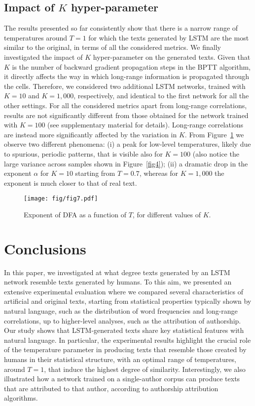 \documentclass[journal]{IEEEtran}
\begin{document}
\subsection{Impact of $K$ hyper-parameter}
The results presented so far consistently show that there is a narrow range of temperatures around $T=1$ for which
the texts generated by LSTM are the most similar to the original, in terms of all the considered metrics.
%
We finally investigated the impact of $K$ hyper-parameter on the generated texts. Given that $K$ is the number of backward gradient propagation steps in the BPTT algorithm, it directly affects the way in which long-range information is propagated through the cells. Therefore, we considered two additional LSTM networks, trained with $K=10$ and $K=1,000$, respectively, and identical to the first network for all the other settings.
%
For all the considered metrics apart from long-range correlations, results are not significantly different from those obtained for the network trained with $K=100$ (see supplementary material for details). Long-range correlations are instead more significantly affected by the variation in $K$. From Figure~\ref{fig:comparison} we observe two different phenomena: (i) a peak for low-level temperatures, likely due to spurious, periodic patterns, that is visible also for $K=100$ (also notice the large variance across samples shown in Figure~\ref{fig4}); (ii) a dramatic drop in the exponent $\alpha$ for $K=10$ starting from $T=0.7$, whereas for $K=1,000$ the exponent is much closer to that of real text.

\begin{figure}[!t]
\begin{center}
\texttt{[image: fig/fig7.pdf]}
 \caption{Exponent of DFA as a function of $T$, for different values of $K$.
\label{fig:comparison}}
\end{center}
\end{figure}



\section{Conclusions}
\label{sec:conclusions}

In this paper, we investigated at what degree texts generated by an LSTM network resemble texts generated by humans. To this aim, we presented an extensive experimental evaluation where we compared several characteristics of artificial and original texts, starting from statistical properties typically shown by natural language, such as the distribution of word frequencies and long-range correlations, up to higher-level analyses, such as the attribution of authorship.
%
Our study shows that LSTM-generated texts share key statistical features with natural language. In particular, the experimental results highlight the crucial role of the temperature parameter in producing texts that resemble those created by humans in their statistical structure, with an optimal range of temperatures, around $T=1$, that induce the highest degree of similarity. Interestingly, we also illustrated how a network trained on a single-author corpus can produce texts that are attributed to that author, according to authorship attribution algorithms.
\end{document}
